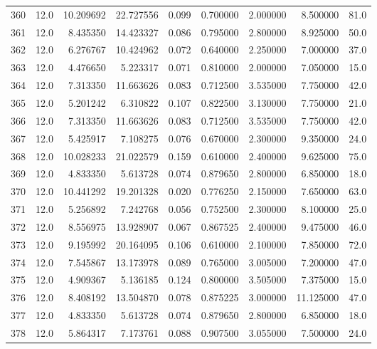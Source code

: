 \begin{tabular}{lrrrrrrrr}
360  &   12.0 &  10.209692 &  22.727556 &  0.099 &  0.700000 &  2.000000 &   8.500000 &   81.0 \\
361  &   12.0 &   8.435350 &  14.423327 &  0.086 &  0.795000 &  2.800000 &   8.925000 &   50.0 \\
362  &   12.0 &   6.276767 &  10.424962 &  0.072 &  0.640000 &  2.250000 &   7.000000 &   37.0 \\
363  &   12.0 &   4.476650 &   5.223317 &  0.071 &  0.810000 &  2.000000 &   7.050000 &   15.0 \\
364  &   12.0 &   7.313350 &  11.663626 &  0.083 &  0.712500 &  3.535000 &   7.750000 &   42.0 \\
365  &   12.0 &   5.201242 &   6.310822 &  0.107 &  0.822500 &  3.130000 &   7.750000 &   21.0 \\
366  &   12.0 &   7.313350 &  11.663626 &  0.083 &  0.712500 &  3.535000 &   7.750000 &   42.0 \\
367  &   12.0 &   5.425917 &   7.108275 &  0.076 &  0.670000 &  2.300000 &   9.350000 &   24.0 \\
368  &   12.0 &  10.028233 &  21.022579 &  0.159 &  0.610000 &  2.400000 &   9.625000 &   75.0 \\
369  &   12.0 &   4.833350 &   5.613728 &  0.074 &  0.879650 &  2.800000 &   6.850000 &   18.0 \\
370  &   12.0 &  10.441292 &  19.201328 &  0.020 &  0.776250 &  2.150000 &   7.650000 &   63.0 \\
371  &   12.0 &   5.256892 &   7.242768 &  0.056 &  0.752500 &  2.300000 &   8.100000 &   25.0 \\
372  &   12.0 &   8.556975 &  13.928907 &  0.067 &  0.867525 &  2.400000 &   9.475000 &   46.0 \\
373  &   12.0 &   9.195992 &  20.164095 &  0.106 &  0.610000 &  2.100000 &   7.850000 &   72.0 \\
374  &   12.0 &   7.545867 &  13.173978 &  0.089 &  0.765000 &  3.005000 &   7.200000 &   47.0 \\
375  &   12.0 &   4.909367 &   5.136185 &  0.124 &  0.800000 &  3.505000 &   7.375000 &   15.0 \\
376  &   12.0 &   8.408192 &  13.504870 &  0.078 &  0.875225 &  3.000000 &  11.125000 &   47.0 \\
377  &   12.0 &   4.833350 &   5.613728 &  0.074 &  0.879650 &  2.800000 &   6.850000 &   18.0 \\
378  &   12.0 &   5.864317 &   7.173761 &  0.088 &  0.907500 &  3.055000 &   7.500000 &   24.0 \\

\end{tabular}
